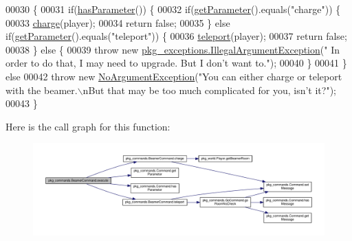 \begin{DoxyCode}
00030                                                                                                            
                              \{
00031         \textcolor{keywordflow}{if}(\hyperlink{classpkg__commands_1_1Command_a02af95ab3f1898a66259ab7c177b6998}{hasParameter}()) \{
00032             \textcolor{keywordflow}{if}(\hyperlink{classpkg__commands_1_1Command_a41c92d445be73ea9d62320c65efb8434}{getParameter}().equals(\textcolor{stringliteral}{"charge"})) \{
00033                 \hyperlink{classpkg__commands_1_1BeamerCommand_ae71665296a18d581ad1f714c1078e37b}{charge}(player);
00034                 \textcolor{keywordflow}{return} \textcolor{keyword}{false};
00035             \} \textcolor{keywordflow}{else} \textcolor{keywordflow}{if}(\hyperlink{classpkg__commands_1_1Command_a41c92d445be73ea9d62320c65efb8434}{getParameter}().equals(\textcolor{stringliteral}{"teleport"})) \{
00036                 \hyperlink{classpkg__commands_1_1BeamerCommand_a2b6c04242d443d4ff36f255b06ce14be}{teleport}(player);
00037                 \textcolor{keywordflow}{return} \textcolor{keyword}{false};
00038             \} \textcolor{keywordflow}{else} \{
00039                 \textcolor{keywordflow}{throw} \textcolor{keyword}{new} \hyperlink{classpkg__exceptions_1_1IllegalArgumentException}{pkg\_exceptions.IllegalArgumentException}(\textcolor{stringliteral}{"
      In order to do that, I may need to upgrade. But I don't want to."});
00040             \}
00041         \} \textcolor{keywordflow}{else} 
00042             \textcolor{keywordflow}{throw} \textcolor{keyword}{new} \hyperlink{classpkg__exceptions_1_1NoArgumentException}{NoArgumentException}(\textcolor{stringliteral}{"You can either charge or teleport with the
       beamer.\(\backslash\)nBut that may be too much complicated for you, isn't it?"});
00043     \}
\end{DoxyCode}


Here is the call graph for this function\-:\nopagebreak
\begin{figure}[H]
\begin{center}
\leavevmode
\includegraphics[width=350pt]{classpkg__commands_1_1BeamerCommand_a139dc852e180cabd8af15cfed37dcf0e_cgraph}
\end{center}
\end{figure}


